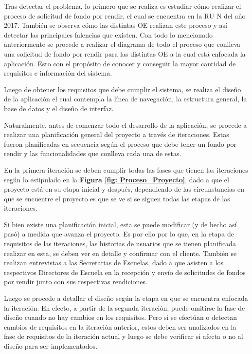 Tras detectar el problema, lo primero que se realiza es estudiar cómo realizar el proceso de solicitud de fondo por rendir, el cual se encuentra en la RU N del año 2017. También se observa cómo las distintas OE realizan este proceso y así detectar las principales falencias que existen. Con todo lo mencionado anteriormente se procede a realizar el diagrama de todo el proceso que conlleva una solicitud de fondo por rendir para las distintas OE a la cual está enfocada la aplicación. Esto con el propósito de conocer y conseguir la mayor cantidad de requisitos e información del sistema.

Luego de obtener los requisitos que debe cumplir el sistema, se realiza el diseño de la aplicación el cual contempla la línea de navegación, la estructura general, la base de datos y el diseño de interfaz.

Naturalmente, antes de comenzar todo el desarrollo de la aplicación, se procede a realizar una planificación general del proyecto a través de iteraciones. Estas fueron planificadas en secuencia según el proceso que debe tener un fondo por rendir y las funcionalidades que conlleva cada una de estas.

En la primera iteración se deben cumplir todas las fases que tienen las iteraciones según lo estipulado en la \textbf{Figura \ref{fig: Proceso_Proyecto}}, dado a que el proyecto está en su etapa inicial y después, dependiendo de las circunstancias en que se encuentre el proyecto es que se ve si se siguen todas las etapas de las iteraciones. 

Si bien existe una planificación inicial, esta se puede modificar (y de hecho así pasó) a medida que avanza el proyecto. Es por ello por lo que, en la etapa de requisitos de las iteraciones, las historias de usuarios que se tienen planificada realizar en esta, se deben ver en detalle y confirmar con el cliente. También se realizan entrevistas a las Secretarias de Escuelas, dado a que asisten a los respectivos Directores de Escuela en la recepción y envío de solicitudes de fondos por rendir junto con sus respectivas rendiciones.

Luego se procede a detallar el diseño según la etapa en que se encuentra enfocada la iteración. En efecto, a partir de la segunda iteración, puede omitirse la fase de diseño cuando no hay cambios en los requisitos. Pero si se efectúan o detectan cambios de requisitos en la iteración anterior, estos deben ser analizados en la fase de requisitos de la iteración actual y luego se debe verificar si afecta o no al diseño para ser implementados.

